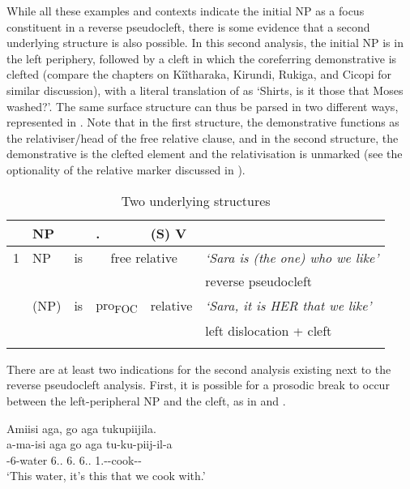 \documentclass[output=paper]{langscibook}
\begin{document}
\z

While all these examples and contexts indicate the initial NP as a focus constituent in a reverse pseudocleft, there is some evidence that a second underlying structure is also possible. In this second analysis, the initial NP is in the left periphery, followed by a cleft in which the coreferring demonstrative is clefted (compare the chapters on Kîîtharaka, Kirundi, Rukiga, and Cicopi for similar discussion), with a literal translation of  as ‘Shirts,  is it those that Moses washed?’. The same surface structure can thus be parsed in two different ways, represented in . Note that in the first structure, the demonstrative functions as the relativiser/head of the free relative clause, and in the second structure, the demonstrative is the clefted element and the relativisation is unmarked (see the optionality of the relative marker discussed in ).

\begin{table}
\begin{tabularx}{\textwidth}{lllllX}
\lsptoprule
 & NP & \IDCOP{} & \DEM{}.\PROX{} & (S) V & \\
\midrule
1 & NP & is & \multicolumn{2}{c}{free relative} & \textit{‘Sara is (the one) who we like’}\\
& & & & & reverse pseudocleft\\
\addlinespace
2 & (NP) & is & pro\textsubscript{FOC} & relative & \textit{‘Sara, it is HER that we like’}\\
& & & & & left dislocation + cleft\\
\lspbottomrule
\end{tabularx}
\caption{Two underlying structures}
\label{tab:nny-twostructures}
\end{table}

There are at least two indications for the second analysis existing next to the reverse pseudocleft analysis. First, it is possible for a prosodic break to occur between the left-peripheral NP and the cleft, as in  and .\largerpage[2.25]

\ea
\label{bkm:Ref125385688}
Amiisi aga, go aga tukupiijila.\\
\gll
a-ma-isi  aga  go  aga  tu-ku-piij-il-a\\
\AUG{}-6-water  6.\DEM.\PROX{}  6.\IDCOP{}  6.\DEM.\PROX{}  1\PL.\SM-\PRS{}-cook-\APPL-\FV{}\\
\glt
‘This water, it’s this that we cook with.’\\
\end{document}
